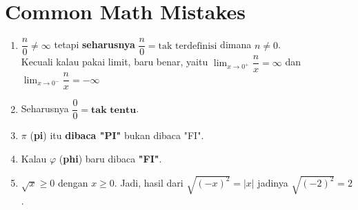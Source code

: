 \section{Common Math Mistakes}

\begin{enumerate}
    \item $\dfrac{n}{0} \neq \infty$ tetapi \textbf{seharusnya} $\dfrac{n}{0} = \text{tak terdefinisi}$ dimana $n \neq 0$.\\
    Kecuali kalau pakai limit, baru benar, yaitu $\lim_{x \rightarrow 0^+} \dfrac{n}{x} = \infty$ dan $\lim_{x \rightarrow 0^-} \dfrac{n}{x} = -\infty$
    \item Seharusnya $\dfrac{0}{0} = \textbf{tak tentu}$.
    \item $\pi$ (\textbf{pi}) itu \textbf{dibaca "PI"} bukan dibaca "FI". 
    \item Kalau $\varphi$ (\textbf{phi}) baru dibaca \textbf{"FI"}.
    \item $\sqrt{x} \ge 0$ dengan $x \ge 0$. Jadi, hasil dari $\sqrt{(-x)^2}=|x|$ jadinya $\sqrt{(-2)^2}=2$.
\end{enumerate}